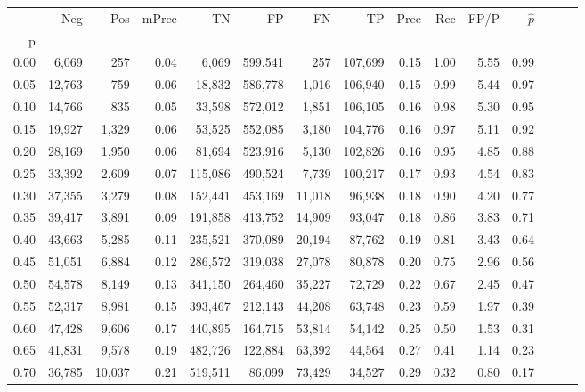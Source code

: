 \begin{tabular}{rrrrrrrrrrrrrrr}
\toprule
{} &     Neg &     Pos & mPrec &       TN &       FP &       FN &       TP &  Prec &   Rec &  FP/P & $\hat{p}$ \\
p    &         &         &       &          &          &          &          &       &       &       &           \\
\midrule
0.00 &   6,069 &     257 &  0.04 &    6,069 &  599,541 &      257 &  107,699 &  0.15 &  1.00 &  5.55 &      0.99 \\
0.05 &  12,763 &     759 &  0.06 &   18,832 &  586,778 &    1,016 &  106,940 &  0.15 &  0.99 &  5.44 &      0.97 \\
0.10 &  14,766 &     835 &  0.05 &   33,598 &  572,012 &    1,851 &  106,105 &  0.16 &  0.98 &  5.30 &      0.95 \\
0.15 &  19,927 &   1,329 &  0.06 &   53,525 &  552,085 &    3,180 &  104,776 &  0.16 &  0.97 &  5.11 &      0.92 \\
0.20 &  28,169 &   1,950 &  0.06 &   81,694 &  523,916 &    5,130 &  102,826 &  0.16 &  0.95 &  4.85 &      0.88 \\
0.25 &  33,392 &   2,609 &  0.07 &  115,086 &  490,524 &    7,739 &  100,217 &  0.17 &  0.93 &  4.54 &      0.83 \\
0.30 &  37,355 &   3,279 &  0.08 &  152,441 &  453,169 &   11,018 &   96,938 &  0.18 &  0.90 &  4.20 &      0.77 \\
0.35 &  39,417 &   3,891 &  0.09 &  191,858 &  413,752 &   14,909 &   93,047 &  0.18 &  0.86 &  3.83 &      0.71 \\
0.40 &  43,663 &   5,285 &  0.11 &  235,521 &  370,089 &   20,194 &   87,762 &  0.19 &  0.81 &  3.43 &      0.64 \\
0.45 &  51,051 &   6,884 &  0.12 &  286,572 &  319,038 &   27,078 &   80,878 &  0.20 &  0.75 &  2.96 &      0.56 \\
0.50 &  54,578 &   8,149 &  0.13 &  341,150 &  264,460 &   35,227 &   72,729 &  0.22 &  0.67 &  2.45 &      0.47 \\
0.55 &  52,317 &   8,981 &  0.15 &  393,467 &  212,143 &   44,208 &   63,748 &  0.23 &  0.59 &  1.97 &      0.39 \\
0.60 &  47,428 &   9,606 &  0.17 &  440,895 &  164,715 &   53,814 &   54,142 &  0.25 &  0.50 &  1.53 &      0.31 \\
0.65 &  41,831 &   9,578 &  0.19 &  482,726 &  122,884 &   63,392 &   44,564 &  0.27 &  0.41 &  1.14 &      0.23 \\
0.70 &  36,785 &  10,037 &  0.21 &  519,511 &   86,099 &   73,429 &   34,527 &  0.29 &  0.32 &  0.80 &      0.17 \\

\end{tabular}
